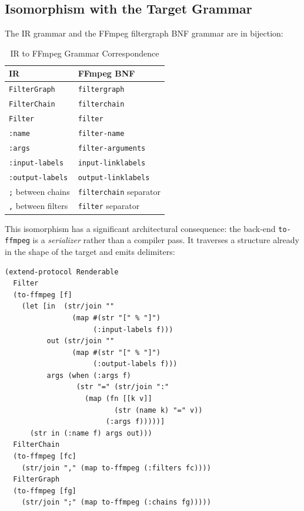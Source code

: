 \documentclass[conference]{IEEEtran}
\begin{document}
\subsection{Isomorphism with the Target Grammar}

The IR grammar and the FFmpeg filtergraph BNF grammar are in bijection:

\begin{table}[htbp]
\centering
\caption{IR to FFmpeg Grammar Correspondence}
\label{tab:isomorphism}
\begin{tabular}{ll}
\toprule
\textbf{IR} & \textbf{FFmpeg BNF} \\
\midrule
\texttt{FilterGraph} & \texttt{filtergraph} \\
\texttt{FilterChain} & \texttt{filterchain} \\
\texttt{Filter} & \texttt{filter} \\
\texttt{:name} & \texttt{filter-name} \\
\texttt{:args} & \texttt{filter-arguments} \\
\texttt{:input-labels} & \texttt{input-linklabels} \\
\texttt{:output-labels} & \texttt{output-linklabels} \\
\texttt{;} between chains & \texttt{filterchain} separator \\
\texttt{,} between filters & \texttt{filter} separator \\
\bottomrule
\end{tabular}
\end{table}

This isomorphism has a significant architectural consequence: the back-end \texttt{to-ffmpeg} is a \emph{serializer} rather than a compiler pass. It traverses a structure already in the shape of the target and emits delimiters:

\begin{lstlisting}[caption={to-ffmpeg as serializer}]
(extend-protocol Renderable
  Filter
  (to-ffmpeg [f]
    (let [in  (str/join ""
                (map #(str "[" % "]")
                     (:input-labels f)))
          out (str/join ""
                (map #(str "[" % "]")
                     (:output-labels f)))
          args (when (:args f)
                 (str "=" (str/join ":"
                   (map (fn [[k v]]
                          (str (name k) "=" v))
                        (:args f)))))]
      (str in (:name f) args out)))
  FilterChain
  (to-ffmpeg [fc]
    (str/join "," (map to-ffmpeg (:filters fc))))
  FilterGraph
  (to-ffmpeg [fg]
    (str/join ";" (map to-ffmpeg (:chains fg)))))
\end{lstlisting}
\end{document}
